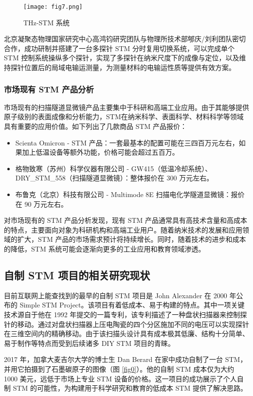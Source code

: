 \documentclass{article}
\begin{document}
\begin{figure}[htbp]
	\centering
	\texttt{[image: fig7.png]}
	\caption{THz-STM 系统}
\end{figure}

北京凝聚态物理国家研究中心高鸿钧研究团队与物理所技术部郇庆/刘利团队密切合作，成功研制并搭建了一台多探针 STM 分时复用切换系统，可以完成单个 STM 控制系统操纵多个探针，实现了多探针在纳米尺度下的成像与定位，以及维持探针位置后的局域电输运测量\cite{ref10}，为测量材料的电输运性质等提供有效方案。

\subsubsection[市场现有 STM 产品分析]{市场现有 STM 产品分析}
市场现有的扫描隧道显微镜产品主要集中于科研和高端工业应用。由于其能够提供原子级别的表面成像和分析能力，STM在纳米科学、表面科学、材料科学等领域具有重要的应用价值。如下列出了几款商品 STM 产品报价：
\begin{itemize}
	\item Scienta Omicron - STM 产品：一套最基本的配置可能在三四百万元左右，如果加上低温设备等额外功能，价格可能会超过五百万。
	\item 格物致寒（苏州）科学仪器有限公司 - GW415（低温冷却系统）、DRY\_STM\_558（扫描隧道显微镜）：整体报价在 300 万元左右。
	\item 布鲁克（北京）科技有限公司 - Multimode 8E 扫描电化学隧道显微镜：报价在 90 万元左右。
\end{itemize}

对市场现有的 STM 产品分析发现，现有 STM 产品通常具有高技术含量和高成本的特点，主要面向对象为科研机构和高端工业用户。随着纳米技术的发展和应用领域的扩大，STM 产品的市场需求预计将持续增长。同时，随着技术的进步和成本的降低，STM 系统可能会逐渐向更多的工业应用和教育领域渗透。

\subsection{自制 STM 项目的相关研究现状}
目前互联网上能查找到的最早的自制 STM 项目是 John Alexander 在 2000 年公布的 Simple STM Project\cite{ref12}。该项目有着低成本、易于构建的特点。其中一项关键技术源自于他在 1992 年提交的一篇专利，该专利描述了一种盘状扫描器来控制探针的移动。通过对盘状扫描器上压电陶瓷的四个分区施加不同的电压可以实现探针在三维空间内的精确移动\cite{ref13}。由于该扫描头设计具有成本极其低廉、结构十分简单、易于制作等特点而受到后续诸多 DIY STM 项目的青睐。

2017 年，加拿大麦吉尔大学的博士生 Dan Berard 在家中成功自制了一台 STM，并用它拍摄到了石墨碳原子的图像（图 \ref{fig0}）\cite{ref11}。他的自制 STM 成本仅为大约 1000 美元，远低于市场上专业 STM 设备的价格。这一项目的成功展示了个人自制 STM 的可能性，为构建用于科学研究和教育的低成本 STM 提供了解决思路。
\end{document}
